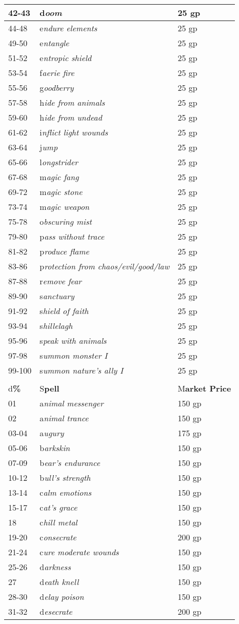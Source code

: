 \documentclass{article}
\begin{document}
\begin{tabular}{|>{\raggedright}p{29pt}|>{\raggedright}p{138pt}|>{\raggedright}p{147pt}|}
\hline
42-43 & d\textit{oom} & 25 gp\tabularnewline
\hline
44-48 & e\textit{ndure elements} & 25 gp\tabularnewline
\hline
49-50 & e\textit{ntangle} & 25 gp\tabularnewline
\hline
51-52 & e\textit{ntropic shield} & 25 gp\tabularnewline
\hline
53-54 & f\textit{aerie fire} & 25 gp\tabularnewline
\hline
55-56 & g\textit{oodberry} & 25 gp\tabularnewline
\hline
57-58 & h\textit{ide from animals} & 25 gp\tabularnewline
\hline
59-60 & h\textit{ide from undead} & 25 gp\tabularnewline
\hline
61-62 & i\textit{nflict light wounds} & 25 gp\tabularnewline
\hline
63-64 & j\textit{ump} & 25 gp\tabularnewline
\hline
65-66 & l\textit{ongstrider} & 25 gp\tabularnewline
\hline
67-68 & m\textit{agic fang} & 25 gp\tabularnewline
\hline
69-72 & m\textit{agic stone} & 25 gp\tabularnewline
\hline
73-74 & m\textit{agic weapon} & 25 gp\tabularnewline
\hline
75-78 & o\textit{bscuring mist} & 25 gp\tabularnewline
\hline
79-80 & p\textit{ass without trace} & 25 gp\tabularnewline
\hline
81-82 & p\textit{roduce flame} & 25 gp\tabularnewline
\hline
83-86 & p\textit{rotection from chaos/evil/good/law} & 25 gp\tabularnewline
\hline
87-88 & r\textit{emove fear} & 25 gp\tabularnewline
\hline
89-90 & s\textit{anctuary} & 25 gp\tabularnewline
\hline
91-92 & s\textit{hield of faith} & 25 gp\tabularnewline
\hline
93-94 & s\textit{hillelagh} & 25 gp\tabularnewline
\hline
95-96 & s\textit{peak with animals} & 25 gp\tabularnewline
\hline
97-98 & s\textit{ummon monster I} & 25 gp\tabularnewline
\hline
99-100 & s\textit{ummon nature's ally I} & 25 gp\tabularnewline
\hline
\multicolumn{3}{|p{314pt}|}{2\textit{\textbf{nd-Level Divine Spells}}}\tabularnewline
\hline
d\textbf{\%} & S\textbf{pell} & M\textbf{arket Price}\tabularnewline
\hline
01 & a\textit{nimal messenger} & 150 gp\tabularnewline
\hline
02 & a\textit{nimal trance} & 150 gp\tabularnewline
\hline
03-04 & a\textit{ugury} & 175 gp\tabularnewline
\hline
05-06 & b\textit{arkskin} & 150 gp\tabularnewline
\hline
07-09 & b\textit{ear's endurance} & 150 gp\tabularnewline
\hline
10-12 & b\textit{ull's strength} & 150 gp\tabularnewline
\hline
13-14 & c\textit{alm emotions} & 150 gp\tabularnewline
\hline
15-17 & c\textit{at's grace} & 150 gp\tabularnewline
\hline
18 & c\textit{hill metal} & 150 gp\tabularnewline
\hline
19-20 & c\textit{onsecrate} & 200 gp\tabularnewline
\hline
21-24 & c\textit{ure moderate wounds} & 150 gp\tabularnewline
\hline
25-26 & d\textit{arkness} & 150 gp\tabularnewline
\hline
27 & d\textit{eath knell} & 150 gp\tabularnewline
\hline
28-30 & d\textit{elay poison} & 150 gp\tabularnewline
\hline
31-32 & d\textit{esecrate} & 200 gp\tabularnewline

\end{tabular}
\end{document}
